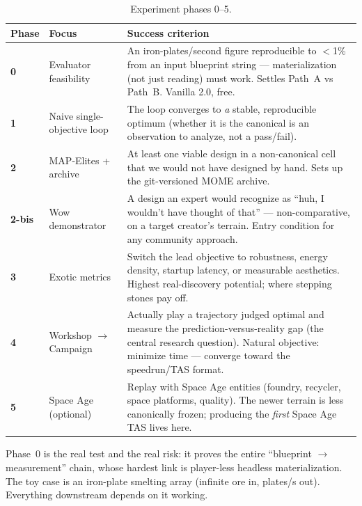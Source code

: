 \documentclass[11pt,a4paper]{article}
\begin{document}
\begin{table}[htbp]
\centering
\caption{Experiment phases 0--5.}
\label{tab:phases}
\small
\renewcommand{\arraystretch}{1.25}
\begin{tabularx}{\textwidth}{@{}l L{3.0cm} X@{}}
\toprule
\textbf{Phase} & \textbf{Focus} & \textbf{Success criterion}\\
\midrule
\textbf{0} & Evaluator feasibility &
  An iron-plates/second figure reproducible to $<$1\% from an input blueprint
  string --- materialization (not just reading) must work. Settles Path~A vs
  Path~B. Vanilla 2.0, free.\\
\textbf{1} & Naive single-objective loop &
  The loop converges to \emph{a} stable, reproducible optimum (whether it is the
  canonical is an observation to analyze, not a pass/fail).\\
\textbf{2} & MAP-Elites + archive &
  At least one viable design in a non-canonical cell that we would not have
  designed by hand. Sets up the git-versioned MOME archive.\\
\textbf{2-bis} & Wow demonstrator &
  A design an expert would recognize as ``huh, I wouldn't have thought of that''
  --- non-comparative, on a target creator's terrain. Entry condition for any
  community approach.\\
\textbf{3} & Exotic metrics &
  Switch the lead objective to robustness, energy density, startup latency, or
  measurable aesthetics. Highest real-discovery potential; where stepping stones
  pay off.\\
\textbf{4} & Workshop $\rightarrow$ Campaign &
  Actually play a trajectory judged optimal and measure the
  prediction-versus-reality gap (the central research question). Natural
  objective: minimize time --- converge toward the speedrun/TAS format.\\
\textbf{5} & Space Age (optional) &
  Replay with Space Age entities (foundry, recycler, space platforms, quality).
  The newer terrain is less canonically frozen; producing the \emph{first} Space
  Age TAS lives here.\\
\bottomrule
\end{tabularx}
\end{table}

Phase~0 is the real test and the real risk: it proves the entire ``blueprint
$\rightarrow$ measurement'' chain, whose hardest link is player-less headless
materialization. The toy case is an iron-plate smelting array (infinite ore in,
plates/s out). Everything downstream depends on it working.
\end{document}
